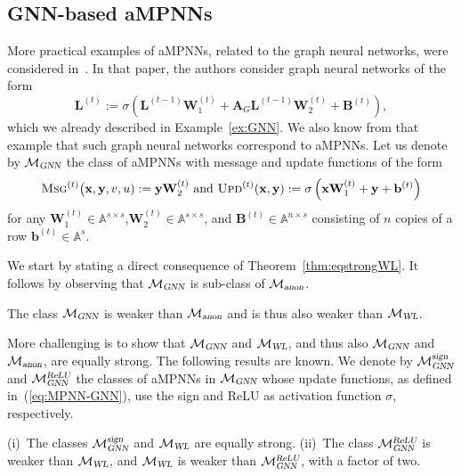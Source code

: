 \subsection{GNN-based aMPNNs}
More practical examples of aMPNNs, related to the graph neural networks, were considered in~\cite{grohewl}.
In that paper, the authors consider graph neural networks of the form
$$
\mathbf{L}^{(t)}:=\sigma\left(\mathbf{L}^{(t-1)}\mathbf{W}_1^{(t)}+\mathbf{A}_G\mathbf{L}^{(t-1)}\mathbf{W}_2^{(t)}+\mathbf{B}^{(t)}\right), $$
which we already described in Example~\ref{ex:GNN}. We also know from that example that such graph neural networks correspond to aMPNNs.
Let us denote by $\mathcal{M}_{\textsl{GNN}}$ the class of aMPNNs with message and update functions of the form
\begin{equation}\textsc{Msg}^{(t)}\bigl(\mathbf{x},\mathbf{y},v,u):=\mathbf{y}\mathbf{W}_2^{(t)}
\text{ and } 
\textsc{Upd}^{(t)}(\mathbf{x},\mathbf{y}):=\sigma\left(\mathbf{x}\mathbf{W}_1^{(t)}+\mathbf{y} + \mathbf{b}^{(t)}\right) \label{eq:MPNN-GNN}
\end{equation}
for any $\mathbf{W}_1^{(t)}\in\mathbb{A}^{s\times s}$,$\mathbf{W}_2^{(t)}\in\mathbb{A}^{s\times s}$, and $\mathbf{B}^{(t)}\in\mathbb{A}^{n\times s}$ consisting of $n$ copies of a row $\mathbf{b}^{(t)}\in\mathbb{A}^{s}$. 

We start by stating a direct consequence of Theorem~\ref{thm:eqstrongWL}. It follows by observing
that $\mathcal{M}_{\textsl{GNN}}$ is sub-class of 
$\mathcal{M}_{\textsl{anon}}$.
\begin{corollary}
	The class 
$\mathcal{M}_{\textsl{GNN}}$ is weaker than $\mathcal{M}_{\textsl{anon}}$ and is thus also weaker than $\mathcal{M}_{\textsl{WL}}$.
\end{corollary}

More challenging is to show that $\mathcal{M}_{\textsl{GNN}}$ and $\mathcal{M}_{\textsl{WL}}$, and thus also $\mathcal{M}_{\textsl{GNN}}$ and $\mathcal{M}_{\textsl{anon}}$, are equally strong. The following results are known. We denote
by $\mathcal{M}_{\textsl{GNN}}^{\textsl{sign}}$
and $\mathcal{M}_{\textsl{GNN}}^{\textsl{ReLU}}$ the classes of  aMPNNs in $\mathcal{M}_{\textsl{GNN}}$ whose update functions, as defined in~(\ref{eq:MPNN-GNN}), use the sign and ReLU as activation function $\sigma$, respectively.

\begin{theorem} \label{thm:grohe_lower}
(i)~The classes $\mathcal{M}_{\textsl{GNN}}^{\textsl{sign}}$ and  $\mathcal{M}_{\textsl{WL}}$ are equally strong. (ii)~The class 
$\mathcal{M}_{\textsl{GNN}}^{\textsl{ReLU}}$ is weaker than $\mathcal{M}_{\textsl{WL}}$, and
$\mathcal{M}_{\textsl{WL}}$ is weaker than $\mathcal{M}_{\textsl{GNN}}^{\textsl{ReLU}}$, with a factor of two.
\end{theorem}


